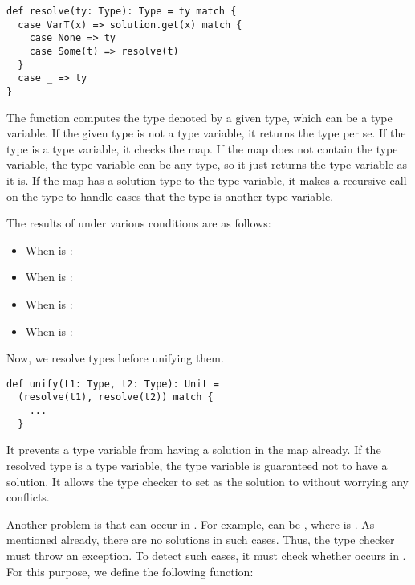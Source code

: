 \begin{verbatim}
def resolve(ty: Type): Type = ty match {
  case VarT(x) => solution.get(x) match {
    case None => ty
    case Some(t) => resolve(t)
  }
  case _ => ty
}
\end{verbatim}

The  function computes the type denoted by a given type, which can
be a type variable. If the given type is not a type variable, it returns the
type per se. If the type is a type variable, it checks the  map.
If the map does not contain the type variable, the type variable can be any
type, so it just returns the type variable as it is. If the map has a solution
type to the type variable, it makes a recursive call on the type to handle cases
that the type is another type variable.

The results of  under various conditions are as follows:

\begin{itemize}
  \item When  is : 
  \item When  is : 
  \item When  is : 
  \item When  is : 
\end{itemize}

Now, we resolve types before unifying them.

\begin{verbatim}
def unify(t1: Type, t2: Type): Unit =
  (resolve(t1), resolve(t2)) match {
    ...
  }
\end{verbatim}

It prevents a type variable from having a solution in the map already. If the
resolved type is a type variable, the type variable is guaranteed not to have a
solution. It allows the type checker to set  as the solution to
 without worrying any conflicts.

Another problem is that  can occur in . For example, 
can be , where  is . As
mentioned already, there are no solutions in such cases. Thus, the type checker
must throw an exception. To detect such cases, it must check whether 
occurs in . For this purpose, we define the following 
function:

